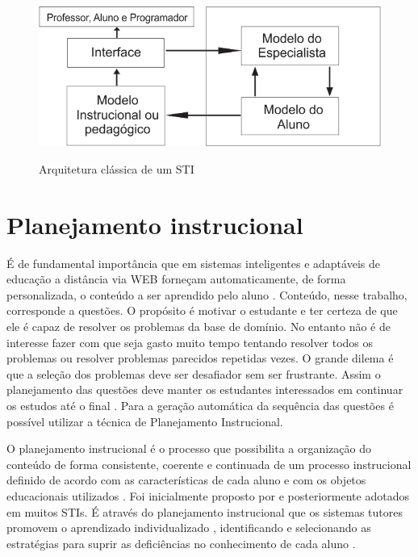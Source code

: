 \documentclass[
12pt,				%
oneside,			%
a4paper,			%
english,			%
brazil				%
]{abntex2ppgsi}
\begin{document}
%
\begin{figure}[H]%
	\centering
	\caption{Arquitetura clássica de um STI}
	\includegraphics{figura1.png}
	\label{fig:figura1}
\end{figure}

\section{Planejamento instrucional}

É de fundamental importância que em sistemas inteligentes e adaptáveis de educação a distância via WEB forneçam automaticamente, de forma personalizada, o conteúdo a ser aprendido pelo aluno \cite{brusilovsky2003}. Conteúdo, nesse trabalho, corresponde a questões. O propósito é motivar o estudante e ter certeza de que ele é capaz de resolver os problemas da base de domínio. No entanto não é de interesse fazer com que seja gasto muito tempo tentando resolver todos os problemas ou resolver problemas parecidos repetidas vezes. O grande dilema é que a seleção dos problemas deve ser desafiador sem ser frustrante. Assim o planejamento das questões deve manter os estudantes interessados em continuar os estudos até o final \cite{cho2000}. Para a geração automática da sequência das questões é possível utilizar a técnica de Planejamento Instrucional.

O planejamento instrucional é o processo que possibilita a organização do conteúdo de forma consistente, coerente e continuada de um processo instrucional definido de acordo com as características de cada aluno e com os objetos educacionais utilizados \cite{vassileva1996, mohan2003}. Foi inicialmente proposto por \cite{peachey1986} e posteriormente adotados em muitos STIs. É através do planejamento instrucional que os sistemas tutores promovem o aprendizado individualizado \cite{mohan2003}, identificando e selecionando as estratégias para suprir as deficiências no conhecimento de cada aluno \cite{polson2013}.
\end{document}
